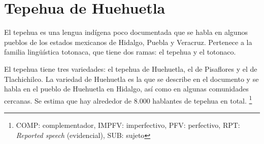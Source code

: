 \section*{Tepehua de Huehuetla}

\noindent El tepehua es una lengua indígena poco documentada que se habla en algunos pueblos de los estados mexicanos de Hidalgo, Puebla y Veracruz. Pertenece a la familia lingüística totonaca, que tiene dos ramas: el tepehua y el totonaco.

El tepehua tiene tres variedades: el tepehua de Huehuetla, el de Pisaflores y el de Tlachichilco. La variedad de Huehuetla es la que se describe en el documento y se habla en el pueblo de Huehuetla en Hidalgo, así como en algunas comunidades cercanas. Se estima que hay alrededor de 8.000 hablantes de tepehua en total.
\footnote{COMP: complementador, IMPFV: imperfectivo, PFV: perfectivo, RPT: \textit{Reported speech} (evidencial), SUB: sujeto}

\vspace{0.5cm}

